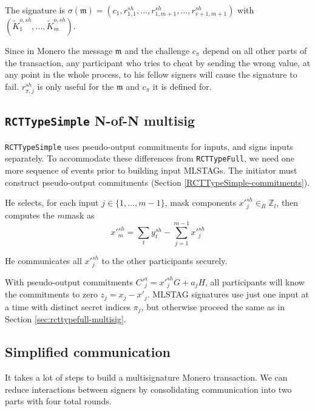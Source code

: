 The signature is $\sigma(\mathfrak{m}) = (c_1,r^{sh}_{1,1},...,r^{sh}_{1,m+1},...,r^{sh}_{v+1,m+1})$ with $(\tilde{K}^{o,sh}_1, ..., \tilde{K}^{o,sh}_m)$.

Since in Monero the message $\mathfrak{m}$ and the challenge $c_{\pi}$ depend on all other parts of the transaction, any participant who tries to cheat by sending the wrong value, at any point in the whole process, to his fellow signers will cause the signature to fail. $r^{sh}_{\pi,j}$ is only useful for the $\mathfrak{m}$ and $c_{\pi}$ it is defined for.



\subsection{{\tt RCTTypeSimple} N-of-N multisig}
\label{sec:rcttypesimple-multisig}

{\tt RCTTypeSimple} uses pseudo-output commitments for inputs, and signs inputs separately. To accommodate these differences from {\tt RCTTypeFull}, we need one more sequence of events prior to building input MLSTAGs. The initiator must construct pseudo-output commitments (Section \ref{RCTTypeSimple-commitments}).

He selects, for each input $j \in \{1,...,m-1\}$, mask components $x'^{sh}_{j} \in_R \mathbb{Z}_l$, then computes the $m$\nth mask as
\[ x'^{sh}_m = \sum_t y^{sh}_t - \sum_{j=1}^{m-1} x'^{sh}_j \]

He communicates all $x'^{sh}_j$ to the other participants securely.

With pseudo-output commitments $C'^a_j = x'^{sh}_j G + a_j H$, all participants will know the commitments to zero $z_j = x_j - x'_j$. MLSTAG signatures use just one input at a time with distinct secret indices $\pi_j$, but otherwise proceed the same as in Section \ref{sec:rcttypefull-multisig}.


\subsection{Simplified communication}
\label{sec:simplified-communication}

It takes a lot of steps to build a multisignature Monero transaction. We can reduce interactions between signers by consolidating communication into two parts with four total rounds.

